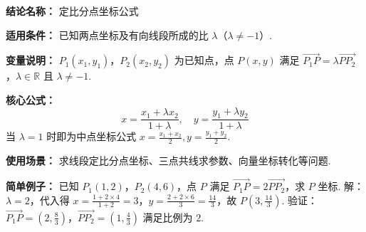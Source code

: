 \textbf{结论名称：} 定比分点坐标公式

\textbf{适用条件：} 已知两点坐标及有向线段所成的比 $\lambda$（$\lambda \neq -1$）.

\textbf{变量说明：} $P_1(x_1,y_1)$，$P_2(x_2,y_2)$ 为已知点，点 $P(x,y)$ 满足 $\overrightarrow{P_1P} = \lambda \overrightarrow{PP_2}$，$\lambda \in \mathbb{R}$ 且 $\lambda \neq -1$.

\textbf{核心公式：} \[ \boxed{ x = \frac{x_1 + \lambda x_2}{1+\lambda},\quad y = \frac{y_1 + \lambda y_2}{1+\lambda} } \] 当 $\lambda = 1$ 时即为中点坐标公式 $x = \frac{x_1+x_2}{2}, y = \frac{y_1+y_2}{2}$.

\textbf{使用场景：} 求线段定比分点坐标、三点共线求参数、向量坐标转化等问题.

\textbf{简单例子：} 已知 $P_1(1,2)$，$P_2(4,6)$，点 $P$ 满足 $\overrightarrow{P_1P}=2\overrightarrow{PP_2}$，求 $P$ 坐标. 解：$\lambda=2$，代入得 $x=\frac{1+2\times4}{1+2}=3$，$y=\frac{2+2\times6}{3}=\frac{14}{3}$，故 $P(3,\frac{14}{3})$. 验证：$\overrightarrow{P_1P}=(2,\frac{8}{3})$，$\overrightarrow{PP_2}=(1,\frac{4}{3})$ 满足比例为 $2$.